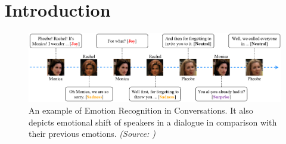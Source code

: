 \section*{Introduction}

    \begin{figure}[h!]
        \centering
        \includegraphics[width=\linewidth]{images/intro_emo.png}
        \captionsetup{width=\linewidth}
        \caption{An example of Emotion Recognition in Conversations. It also depicts  emotional shift of speakers in a dialogue in comparison with their previous emotions. \textit{(Source: \cite{hitrans})}}
        \label{fig:emo}
    \end{figure}



